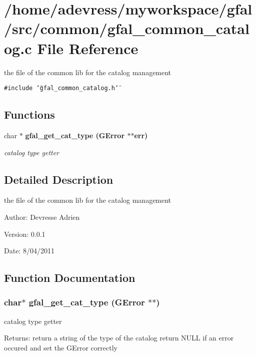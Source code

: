 \section{/home/adevress/myworkspace/gfal/src/common/gfal\_\-common\_\-catalog.c File Reference}
\label{gfal__common__catalog_8c}
the file of the common lib for the catalog management 

{\tt \#include \char`\"{}gfal\_\-common\_\-catalog.h\char`\"{}}\par
\subsection*{Functions}
\begin{CompactItemize}
\item 
char $\ast$ \bf{gfal\_\-get\_\-cat\_\-type} (GError $\ast$$\ast$err)
\begin{CompactList}\small\item\em catalog type getter \item\end{CompactList}\end{CompactItemize}


\subsection{Detailed Description}
the file of the common lib for the catalog management 

\begin{Desc}
\item[Author:]Devresse Adrien \end{Desc}
\begin{Desc}
\item[Version:]0.0.1 \end{Desc}
\begin{Desc}
\item[Date:]8/04/2011 \end{Desc}


\subsection{Function Documentation}
\subsubsection{\setlength{\rightskip}{0pt plus 5cm}char$\ast$ gfal\_\-get\_\-cat\_\-type (GError $\ast$$\ast$)}\label{gfal__common__catalog_8c_c20aa1a376c802d0c60208854537851e}


catalog type getter 

\begin{Desc}
\item[Returns:]return a string of the type of the catalog return NULL if an error occured and set the GError correctly \end{Desc}
